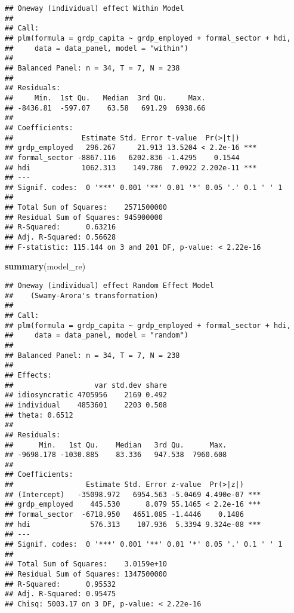 \documentclass[
]{article}
\newenvironment{Shaded}{\begin{snugshade}}{\end{snugshade}}
\newcommand{\FunctionTok}[1]{\textcolor[rgb]{0.13,0.29,0.53}{\textbf{#1}}}
\newcommand{\NormalTok}[1]{#1}
\begin{document}
\begin{verbatim}
## Oneway (individual) effect Within Model
## 
## Call:
## plm(formula = grdp_capita ~ grdp_employed + formal_sector + hdi, 
##     data = data_panel, model = "within")
## 
## Balanced Panel: n = 34, T = 7, N = 238
## 
## Residuals:
##     Min.  1st Qu.   Median  3rd Qu.     Max. 
## -8436.81  -597.07    63.58   691.29  6938.66 
## 
## Coefficients:
##                Estimate Std. Error t-value  Pr(>|t|)    
## grdp_employed   296.267     21.913 13.5204 < 2.2e-16 ***
## formal_sector -8867.116   6202.836 -1.4295    0.1544    
## hdi            1062.313    149.786  7.0922 2.202e-11 ***
## ---
## Signif. codes:  0 '***' 0.001 '**' 0.01 '*' 0.05 '.' 0.1 ' ' 1
## 
## Total Sum of Squares:    2571500000
## Residual Sum of Squares: 945900000
## R-Squared:      0.63216
## Adj. R-Squared: 0.56628
## F-statistic: 115.144 on 3 and 201 DF, p-value: < 2.22e-16
\end{verbatim}

\begin{Shaded}
\begin{Highlighting}[]
\FunctionTok{summary}\NormalTok{(model\_re)}
\end{Highlighting}
\end{Shaded}

\begin{verbatim}
## Oneway (individual) effect Random Effect Model 
##    (Swamy-Arora's transformation)
## 
## Call:
## plm(formula = grdp_capita ~ grdp_employed + formal_sector + hdi, 
##     data = data_panel, model = "random")
## 
## Balanced Panel: n = 34, T = 7, N = 238
## 
## Effects:
##                   var std.dev share
## idiosyncratic 4705956    2169 0.492
## individual    4853601    2203 0.508
## theta: 0.6512
## 
## Residuals:
##      Min.   1st Qu.    Median   3rd Qu.      Max. 
## -9698.178 -1030.885    83.336   947.538  7960.608 
## 
## Coefficients:
##                 Estimate Std. Error z-value  Pr(>|z|)    
## (Intercept)   -35098.972   6954.563 -5.0469 4.490e-07 ***
## grdp_employed    445.530      8.079 55.1465 < 2.2e-16 ***
## formal_sector  -6718.950   4651.085 -1.4446    0.1486    
## hdi              576.313    107.936  5.3394 9.324e-08 ***
## ---
## Signif. codes:  0 '***' 0.001 '**' 0.01 '*' 0.05 '.' 0.1 ' ' 1
## 
## Total Sum of Squares:    3.0159e+10
## Residual Sum of Squares: 1347500000
## R-Squared:      0.95532
## Adj. R-Squared: 0.95475
## Chisq: 5003.17 on 3 DF, p-value: < 2.22e-16
\end{verbatim}
\end{document}
